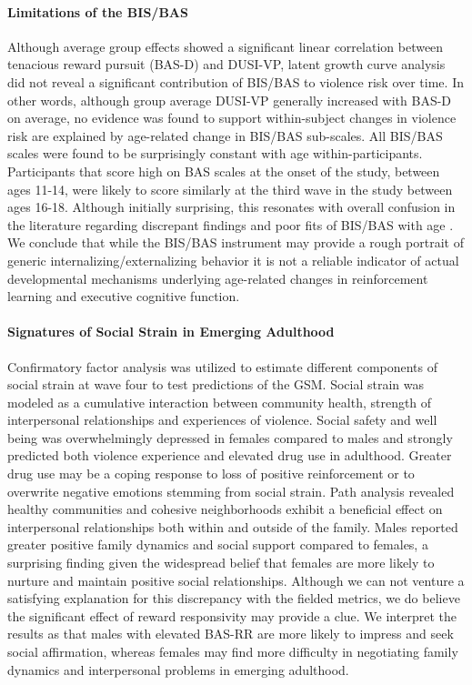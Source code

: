 \documentclass[utf8]{article}
\begin{document}
\paragraph{Limitations of the BIS/BAS} Although average group effects showed a significant linear correlation between tenacious reward pursuit (BAS-D) and DUSI-VP, latent growth curve analysis did not reveal a significant contribution of BIS/BAS to violence risk over time. In other words, although group average DUSI-VP generally increased with BAS-D on average, no evidence was found to support within-subject changes in violence risk are explained by age-related change in BIS/BAS sub-scales. All BIS/BAS scales were found to be surprisingly constant with age within-participants. Participants that score high on BAS scales at the onset of the study, between ages 11-14, were likely to score similarly at the third wave in the study between ages 16-18. Although initially surprising, this resonates with overall confusion in the literature regarding discrepant findings and poor fits of BIS/BAS with age \citep{pagliaccio2016revising}. We conclude that while the BIS/BAS instrument may provide a rough portrait of generic internalizing/externalizing behavior it is not a reliable indicator of actual developmental mechanisms underlying age-related changes in reinforcement learning and executive cognitive function. 
\paragraph{Signatures of Social Strain in Emerging Adulthood} Confirmatory factor analysis was utilized to estimate different components of social strain at wave four to test predictions of the GSM. Social strain was modeled as a cumulative interaction between community health, strength of interpersonal relationships and experiences of violence. Social safety and well being was overwhelmingly depressed in females compared to males and strongly predicted both violence experience and elevated drug use in adulthood. Greater drug use may be a coping response to loss of positive reinforcement or to overwrite negative emotions stemming from social strain. Path analysis revealed healthy communities and cohesive neighborhoods exhibit a beneficial effect on interpersonal relationships both within and outside of the family. Males reported greater positive family dynamics and social support compared to females, a surprising finding given the widespread belief that females are more likely to nurture and maintain positive social relationships. Although we can not venture a satisfying explanation for this discrepancy with the fielded metrics, we do believe the significant effect of reward responsivity may provide a clue. We interpret the results as that males with elevated BAS-RR are more likely to impress and seek social affirmation, whereas females may find more difficulty in negotiating family dynamics and interpersonal problems in emerging adulthood. 
\end{document}
